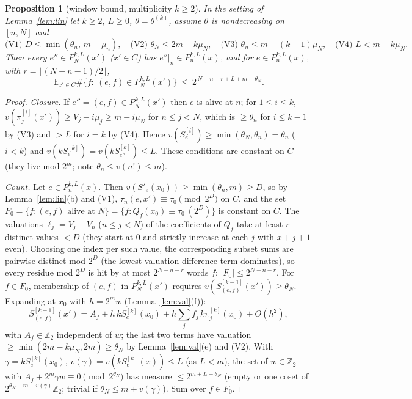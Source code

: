 \documentclass[11pt]{amsart}
\newtheorem{proposition}[theorem]{Proposition}
\theoremstyle{definition}
\newcommand{\Z}{\mathbb Z}
\newcommand{\E}{\mathbb E}
\begin{document}
\begin{proposition}[window bound, multiplicity $k\ge2$]\label{prop:window2}
In the setting of Lemma~\ref{lem:lin} let $k\ge2$, $L\ge0$, $\theta=\theta^{(k)}$, assume $\theta$ is nondecreasing on $[n,N]$ and
\[\text{(V1) } D\le\min(\theta_n,\,m-\mu_n),\quad\text{(V2) }\theta_N\le 2m-k\mu_N,\quad
\text{(V3) }\theta_n\le m-(k-1)\mu_N,\quad\text{(V4) }L<m-k\mu_N .\]
Then every $e''\in P^{k,L}_N(x')$ ($x'\in C$) has $e''|_n\in P^{k,L}_n(x)$, and for $e\in P^{k,L}_n(x)$, with $r=\lfloor(N-n-1)/2\rfloor$,
\[\E_{x'\in C}\#\{f:\ (e,f)\in P^{k,L}_N(x')\}\ \le\ 2^{\,N-n-r+L+m-\theta_N}.\]
\end{proposition}
\begin{proof}
\emph{Closure.} If $e''=(e,f)\in P^{k,L}_N(x')$ then $e$ is alive at $n$; for $1\le i\le k$, $v(\pi^{[i]}_j(x'))\ge V_j-i\mu_j\ge m-i\mu_N$
for $n\le j<N$, which is $\ge\theta_n$ for $i\le k-1$ by (V3) and $>L$ for $i=k$ by (V4). Hence $v(S^{[i]}_e)\ge\min(\theta_N,\theta_n)=\theta_n$
($i<k$) and $v(kS^{[k]}_e)=v(kS^{[k]}_{e''})\le L$. These conditions are constant on $C$ (they live mod $2^m$; note $\theta_n\le v(n!)\le m$).

\emph{Count.} Let $e\in P^{k,L}_n(x)$. Then $v(S'_e(x_0))\ge\min(\theta_n,m)\ge D$, so by Lemma~\ref{lem:lin}(b) and (V1),
$\tau_n(e,x')\equiv\tau_0\pmod{2^D}$ on $C$, and the set $F_0=\{f:(e,f)\text{ alive at }N\}=\{f:Q_f(x_0)\equiv\tau_0\ (2^D)\}$ is constant on $C$.
The valuations $\ell_j=V_j-V_n$ ($n\le j<N$) of the coefficients of $Q_f$ take at least $r$ distinct values $<D$
(they start at $0$ and strictly increase at each $j$ with $x+j+1$ even). Choosing one index per such value, the corresponding
subset sums are pairwise distinct mod $2^D$ (the lowest-valuation difference term dominates), so every residue mod $2^D$ is hit by at most
$2^{N-n-r}$ words $f$: $|F_0|\le2^{N-n-r}$. For $f\in F_0$, membership of $(e,f)$ in $P^{k,L}_N(x')$ requires
$v(S^{[k-1]}_{(e,f)}(x'))\ge\theta_N$. Expanding at $x_0$ with $h=2^mw$ (Lemma~\ref{lem:val}(f)):
\[ S^{[k-1]}_{(e,f)}(x')=A_f+h\,kS^{[k]}_e(x_0)+h\textstyle\sum_jf_j\,k\pi^{[k]}_j(x_0)+O(h^2), \]
with $A_f\in\Z_2$ independent of $w$; the last two terms have valuation $\ge\min(2m-k\mu_N,2m)\ge\theta_N$ by Lemma~\ref{lem:val}(e) and (V2).
With $\gamma=kS^{[k]}_e(x_0)$, $v(\gamma)=v(kS^{[k]}_e(x))\le L$ (as $L<m$), the set of $w\in\Z_2$ with $A_f+2^m\gamma w\equiv0\pmod{2^{\theta_N}}$
has measure $\le 2^{m+L-\theta_N}$ (empty or one coset of $2^{\theta_N-m-v(\gamma)}\Z_2$; trivial if $\theta_N\le m+v(\gamma)$).
Sum over $f\in F_0$.
\end{proof}
\end{document}

